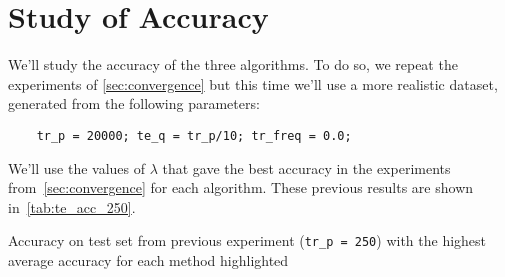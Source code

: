
\section{Study of Accuracy}

We'll study the accuracy of the three algorithms. To do so, we
repeat the experiments of \cref{sec:convergence} but this time
we'll use a more realistic dataset, generated from the following
parameters:
\begin{center}
    \begin{BVerbatim}
    tr_p = 20000; te_q = tr_p/10; tr_freq = 0.0;
    \end{BVerbatim}
\end{center}

We'll use the values of $\lambda$ that gave the best accuracy in
the experiments from~\cref{sec:convergence} for each algorithm.
These previous results are shown in~\cref{tab:te_acc_250}.

\begin{table}[ht]
    \caption{Accuracy on test set from previous experiment (\texttt{tr\_p = 250}) with
    the highest average accuracy for each method highlighted}%
    \label{tab:te_acc_250}%
    
\end{table}
